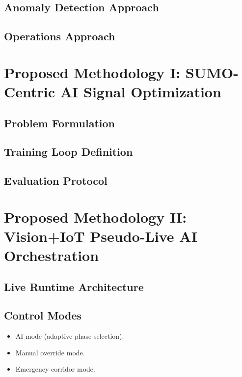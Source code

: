 \documentclass[conference]{IEEEtran}
\begin{document}
\subsection{Anomaly Detection Approach}

\subsection{Operations Approach}

\section{Proposed Methodology I: SUMO-Centric AI Signal Optimization}
\subsection{Problem Formulation}

\subsection{Training Loop Definition}

\subsection{Evaluation Protocol}

\section{Proposed Methodology II: Vision+IoT Pseudo-Live AI Orchestration}
\subsection{Live Runtime Architecture}

\subsection{Control Modes}
\begin{itemize}[leftmargin=*]
	\item AI mode (adaptive phase selection).
	\item Manual override mode.
	\item Emergency corridor mode.
\end{itemize}
\end{document}
